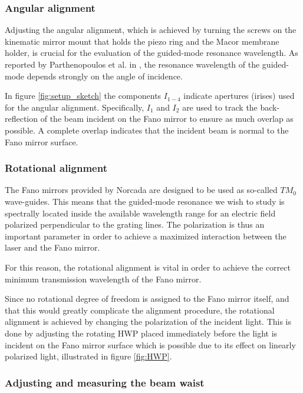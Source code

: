 \newpage
\subsubsection*{Angular alignment}
Adjusting the angular alignment, which is achieved by turning the screws on the kinematic mirror mount that holds the piezo ring and the Macor membrane holder, is crucial for the evaluation of the guided-mode resonance wavelength. As reported by Parthenopoulos et al. in \cite{Parthenopoulos}, the resonance wavelength of the guided-mode depends strongly on the angle of incidence. 

In figure \ref{fig:setup_sketch} the components $I_{1-4}$ indicate apertures (irises) used for the angular alignment. Specifically, $I_1$ and $I_2$ are used to track the back-reflection of the beam incident on the Fano mirror to ensure as much overlap as possible. A complete overlap indicates that the incident beam is normal to the Fano mirror surface. 

\subsubsection*{Rotational alignment}
The Fano mirrors provided by Norcada are designed to be used as so-called $TM_0$ wave-guides. This means that the guided-mode resonance we wish to study is spectrally located inside the available wavelength range for an electric field polarized perpendicular to the grating lines. The polarization is thus an important parameter in order to achieve a maximized interaction between the laser and the Fano mirror\cite{Sadov}.

For this reason, the rotational alignment is vital in order to achieve the correct minimum transmission wavelength of the Fano mirror. 

Since no rotational degree of freedom is assigned to the Fano mirror itself, and that this would greatly complicate the alignment procedure, the rotational alignment is achieved by changing the polarization of the incident light. This is done by adjusting the rotating HWP placed immediately before the light is incident on the Fano mirror surface which is possible due to its effect on linearly polarized light, illustrated in figure \ref{fig:HWP}.

\subsubsection{Adjusting and measuring the beam waist}\label{sec:beam_waist}


